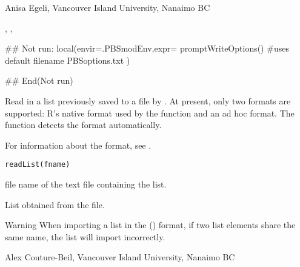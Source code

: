 \documentclass[letterpaper]{book}
\begin{document}
%
\begin{Author}\relax
Anisa Egeli, Vancouver Island University, Nanaimo BC
\end{Author}
%
\begin{SeeAlso}\relax
{}, ,
\end{SeeAlso}
%
\begin{Examples}
\begin{ExampleCode}
## Not run: 
local(envir=.PBSmodEnv,expr={
  promptWriteOptions() #uses default filename PBSoptions.txt
})

## End(Not run)
\end{ExampleCode}
\end{Examples}
%
\begin{Description}\relax
Read in a list previously saved to a file by .  At
present, only two formats are supported: R's native format used by the
 function and an ad hoc  format.  The
function  detects the format automatically.

For information about the  format, see .
\end{Description}
%
\begin{Usage}
\begin{verbatim}
readList(fname)
\end{verbatim}
\end{Usage}
%
\begin{Arguments}
\begin{ldescription}
\item[\code{fname}] file name of the text file containing the list.
\end{ldescription}
\end{Arguments}
%
\begin{Value}
List obtained from the file.
\end{Value}
%
\begin{Section}{Warning}
When importing a list in the  () format,
if two list elements share the same name, the list will import
incorrectly.
\end{Section}
%
\begin{Author}\relax
Alex Couture-Beil, Vancouver Island University, Nanaimo BC
\end{Author}
\end{document}
